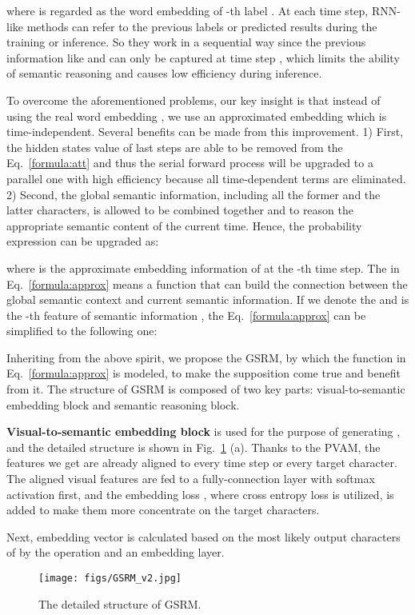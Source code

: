 \documentclass[10pt,twocolumn,letterpaper]{article}
\begin{document}
\begin{CJK}{UTF8}{gbsn}
where  is regarded as the word embedding of -th label . At each time step, RNN-like methods can refer to the previous labels or predicted results during the training or inference. So they work in a sequential way since the previous information like  and  can only be captured at time step , which  limits the ability of semantic reasoning
and causes low efficiency during inference. 

To overcome the aforementioned problems, our key insight is that instead of using the real word embedding , we use an approximated embedding  which is time-independent.
Several benefits can be made from this improvement. 
1) First, the hidden states value of last steps  are able to be removed from the Eq.~\ref{formula:att} and thus the serial forward process will be upgraded to a parallel one with high efficiency because all time-dependent terms are eliminated. 
2) Second, the global semantic information, including all the former and the latter characters, is allowed to be combined together and to reason the appropriate semantic content of the current time.
Hence, the probability expression can be upgraded as:

where  is the approximate embedding information of  at the -th time step. The  in Eq.~\ref{formula:approx} means a function that can build the connection between the global semantic context and current semantic information. If we denote the  and  is the -th feature of semantic information , the Eq.~\ref{formula:approx} can be simplified to the following one:

Inheriting from the above spirit, we propose the GSRM, by which the function  in Eq.~\ref{formula:approx} is modeled, to make the supposition come true and benefit from it.
The structure of GSRM is composed of two key parts: visual-to-semantic embedding block and semantic reasoning block.

\textbf{Visual-to-semantic embedding block} is used for the purpose of generating , and the detailed structure is shown in Fig.~\ref{fig:GSRM} (a). Thanks to the PVAM, the features we get are already aligned to every time step or every target character. The aligned visual features  are fed to a fully-connection layer with softmax activation first, and the embedding loss , where cross entropy loss is utilized, is added to make them more concentrate on the target characters.

Next, embedding vector  is calculated based on the most likely output characters of  by the  operation and an embedding layer. 
\begin{figure}
    \centering
    \texttt{[image: figs/GSRM\_v2.jpg]}
    \caption{The detailed structure of GSRM.}
    \label{fig:GSRM}
    \vspace{-3mm}
\end{figure}


\end{CJK}
\end{document}
